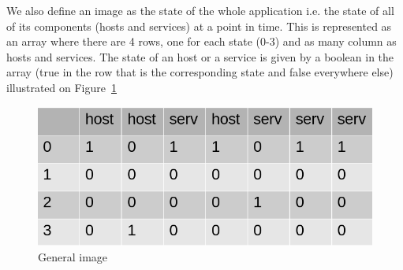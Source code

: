 \documentclass[10pt,a4paper,oneside]{article}
\begin{document}
\vspace{0.8cm}

\begin{multicols}{2}
We also define an image as the state of the whole application i.e. the state of all of its components (hosts and services) at a point in time. This is represented as an array where there are 4 rows, one for each state (0-3) and as many column as hosts and services. The state of an host or a service is given by a boolean in the array (true in the row that is the corresponding state and false everywhere else) illustrated on Figure~\ref{image}

\end{multicols}

\vspace{0.8cm}

\begin{figure}[!h]
\centering
\includegraphics[scale=0.5]{./images/image.png}
\caption{General image}
\label{image}
\end{figure}

\vspace{0.8cm}
\end{document}
